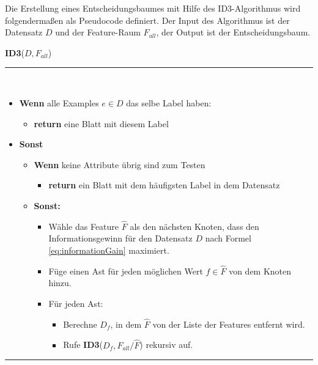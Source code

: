 Die Erstellung eines Entscheidungsbaumes mit Hilfe des ID3-Algorithmus wird folgendermaßen als Pseudocode definiert. Der Input des Algorithmus ist der Datensatz $D$ und der Feature-Raum $F_{all}$, der Output ist der Entscheidungsbaum.\cite[S. 139]{machine_marsland}
\vspace{4mm}

\noindent\textbf{ID3}($D,F_{all}$) \noindent\rule{0.85\linewidth}{0.3pt} \\[-3mm]
\begin{itemize}
\item \textbf{Wenn} alle Examples $e \in D$ das selbe Label haben:
	\begin{itemize}
	\item \textbf{return} eine Blatt mit diesem Label
	\end{itemize}
\item \textbf{Sonst}
	\begin{itemize} 
	\item \textbf{Wenn} keine Attribute übrig sind zum Testen
		\begin{itemize}
		\item \textbf{return} ein Blatt mit dem häufigsten Label in dem Datensatz
		\end{itemize}
	\item \textbf{Sonst:} 
		\begin{itemize}
		\item Wähle das Feature $\hat{F}$ als den nächsten Knoten, dass den Informationsgewinn für den Datensatz $D$ nach Formel \ref{eq:informationGain} maximiert.
		\item Füge einen Ast für jeden möglichen Wert $f \in \hat{F}$ von dem Knoten hinzu.
		\item Für jeden Ast:
			\begin{itemize}
			\item Berechne $D_f$, in dem $\hat{F}$ von der Liste der Features entfernt wird.
			\item Rufe \textbf{ID3}($D_f, F_{all} / \hat{F}$) rekursiv auf.
			\end{itemize}
		\end{itemize}
	\end{itemize} 
\end{itemize}

\noindent\rule{\linewidth}{0.3pt}

\vspace{3mm}

